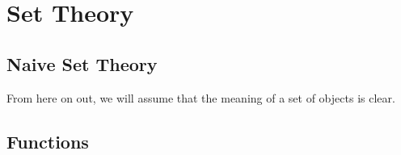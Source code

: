 \chapter{Set Theory}

\section{Naive Set Theory}
From here on out, we will assume that the meaning of a set of objects is clear.













\section{Functions}



